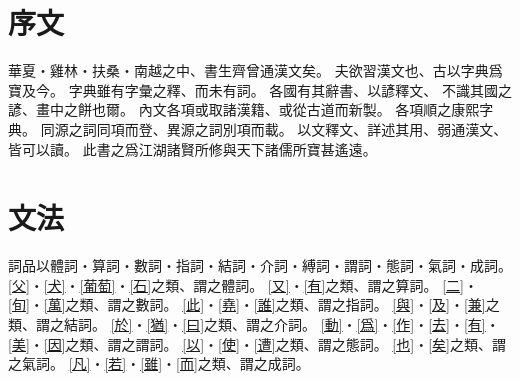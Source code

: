 \chapter*{序文}
華夏・雞林・扶桑・南越之中、書生齊曾通漢文矣。
夫欲習漢文也、古以字典爲寶及今。
字典雖有字彙之釋、而未有詞。
各國有其辭書、以諺釋文、
不識其國之諺、畫中之餅也爾。
內文各項或取諸漢籍、或從古道而新製。
各項順之康熙字典。
同源之詞同項而登、異源之詞別項而載。
以文釋文、詳述其用、弱通漢文、皆可以讀。
此書之爲江湖諸賢所修與天下諸儒所寶甚遙遠。
\chapter*{文法}
詞品以體詞・算詞・數詞・指詞・結詞・介詞・縛詞・謂詞・態詞・氣詞・成詞。
\cref{父}・\cref{犬}・\cref{葡萄}・\cref{石}之類、謂之體詞。
\cref{又}・\cref{有}之類、謂之算詞。
\cref{二}・\cref{旬}・\cref{萬}之類、謂之數詞。
\cref{此}・\cref{堯}・\cref{誰}之類、謂之指詞。
\cref{與}・\cref{及}・\cref{兼}之類、謂之結詞。
\cref{於}・\cref{猶}・\cref{曰}之類、謂之介詞。
\cref{動}・\cref{爲}・\cref{作}・\cref{去}・\cref{有}・\cref{美}・\cref{因}之類、謂之謂詞。
\cref{以}・\cref{使}・\cref{遭}之類、謂之態詞。
\cref{也}・\cref{矣}之類、謂之氣詞。
\cref{凡}・\cref{若}・\cref{雖}・\cref{而}之類、謂之成詞。
